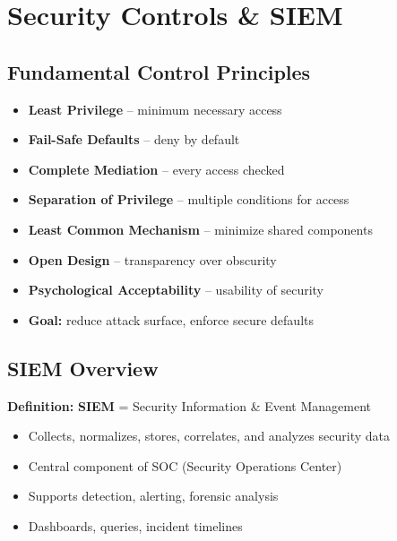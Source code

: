 \section{Security Controls \& SIEM}

\subsection{Fundamental Control Principles}
{
\begin{itemize}[noitemsep]
  \item \textbf{Least Privilege} – minimum necessary access
  \item \textbf{Fail-Safe Defaults} – deny by default
  \item \textbf{Complete Mediation} – every access checked
  \item \textbf{Separation of Privilege} – multiple conditions for access
  \item \textbf{Least Common Mechanism} – minimize shared components
  \item \textbf{Open Design} – transparency over obscurity
  \item \textbf{Psychological Acceptability} – usability of security
  \item \textbf{Goal:} reduce attack surface, enforce secure defaults
\end{itemize}
}

\subsection{SIEM Overview}
{
\textbf{Definition:} \textbf{SIEM} = Security Information \& Event Management

\begin{itemize}[noitemsep]
  \item Collects, normalizes, stores, correlates, and analyzes security data
  \item Central component of SOC (Security Operations Center)
  \item Supports detection, alerting, forensic analysis
  \item Dashboards, queries, incident timelines
\end{itemize}
}

